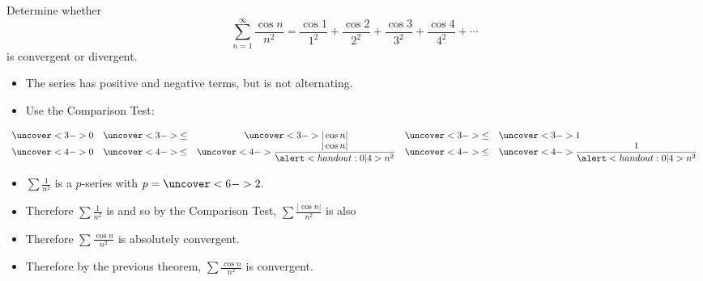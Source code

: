 \begin{frame}
\begin{example} %
Determine whether
\abovedisplayskip=0pt
\belowdisplayskip=0pt
\[
\sum_{n=1}^\infty \frac{\cos n}{n^2} = \frac{\cos 1}{1^2} + \frac{\cos 2}{2^2} + \frac{\cos 3}{3^2} + \frac{\cos 4}{4^2} + \cdots%
\]
is convergent or divergent.
\begin{itemize}
\item<2->  The series has positive and negative terms, but is not alternating.
\item<3->  Use the Comparison Test:
\end{itemize}
\abovedisplayskip=0pt
\belowdisplayskip=0pt
\[
\displaystyle \begin{array}{rcccl}
\uncover<3->{%
0%
}%
& \uncover<3->{ \leq } & %
\uncover<3->{%
| \cos n |%
}%
& \uncover<3->{ \leq } & %
\uncover<3->{%
1%
}\\%
\uncover<4->{%
0%
}%
& \uncover<4->{ \leq } & %
\uncover<4->{%
\displaystyle \frac{| \cos n |}{\alert<handout:0| 4>{n^2}}%
}%
& \uncover<4->{ \leq } & %
\uncover<4->{%
\displaystyle \frac{1}{\alert<handout:0| 4>{n^2}}%
}%
\end{array}
\]
\vspace{-.5cm}
\begin{itemize}
\item<5->  $\sum \frac{1}{n^2}$ is a $p$-series with \alert<handout:0| 5-6>{$p = \uncover<6->{2.}$}
\item<7->  Therefore $\sum \frac{1}{n^2}$ is  and so by the Comparison Test, $\sum \frac{|\cos n|}{n^2}$ is also 
\item<9->  Therefore $\sum \frac{\cos n}{n^2}$ is absolutely convergent.
\item<10->  Therefore by the previous theorem, $\sum \frac{\cos n}{n^2}$ is convergent.
\end{itemize}
\end{example}
\end{frame}
